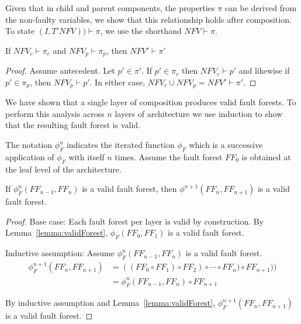 Given that in child and parent components, the properties $\pi$ can be derived from the non-faulty variables, we show that this relationship holds after composition. To state $(I, T'\mathit{NFV})) \vdash \pi$, we use the shorthand $\mathit{NFV} \vdash \pi$. 

\begin{theorem} If $\mathit{NFV}_c \vdash \pi_c$ and $\mathit{NFV}_p \vdash \pi_p$, then $\mathit{NFV}' \vdash \pi'$
\begin{proof}
Assume antecedent. Let $p' \in \pi'$. If $p' \in \pi_c$ then $\mathit{NFV}_c \vdash p'$ and likewise if $p' \in \pi_p$, then $\mathit{NFV}_p \vdash p'$. In either case, $\mathit{NFV}_c \cup \mathit{NFV}_p = \mathit{NFV}' \vdash \pi'$.
\end{proof}
\end{theorem} 


We have shown that a single layer of composition produces valid fault forests. To perform this analysis across $n$ layers of architecture we use induction to show that the resulting fault forest is valid. 

The notation $\phi_F^n$ indicates the iterated function $\phi_F$ which is a successive application of $\phi_F$ with itself $n$ times. Assume the fault forest $\mathit{FF_0}$ is obtained at the leaf level of the architecture.

\begin{theorem} If $\phi_F^n(\mathit{FF_{n-1}}, \mathit{FF_n})$ is a valid fault forest, then $\phi^{n+1}(\mathit{FF_n}, \mathit{FF_{n+1}})$ is a valid fault forest.
\begin{proof}

Base case: Each fault forest per layer is valid by construction. By Lemma~\ref{lemma:validForest}, $\phi_F(\mathit{FF_0}, \mathit{FF_1})$ is a valid fault forest.

Inductive assumption: Assume $\phi_F^n(\mathit{FF_{n-1}}, \mathit{FF_n})$ is a valid fault forest.
\begin{equation*}
\begin{split}
\phi_F^{n+1}(\mathit{FF_n}, \mathit{FF_{n+1}}) &= ((\mathit{FF_0} \circ \mathit{FF_1}) \circ \mathit{FF}_2) \circ \cdots \circ \mathit{FF_n}) \circ \mathit{FF_{n+1}})) \\
  &= \phi_F^n(\mathit{FF_{n-1}}, \mathit{FF_n}) \circ \mathit{FF_{n+1}}
\end{split}
\end{equation*}


By inductive assumption and Lemma~\ref{lemma:validForest}, $\phi_F^{n+1}(\mathit{FF_n}, \mathit{FF_{n+1}})$ is a valid fault forest.

\end{proof}
\label{thm:indForest}
\end{theorem}

